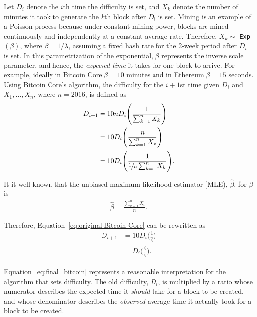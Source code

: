 Let $D_i$ denote the $i$th time the difficulty is set, and $X_k$ denote the number of minutes it took to generate the $k$th block after $D_i$ is set. 
Mining is an example of a Poisson process because under constant
mining power, blocks are mined continuously and independently at a
constant average rate.  Therefore, $X_k \sim$ \texttt{Exp}$(\beta)$, where $\beta = 1/\lambda$, assuming a fixed hash rate for the 2-week period after $D_i$ is set. In this parametrization of the exponential, $\beta$ represents the inverse scale parameter, and hence, the {\em expected time} it takes for one block to arrive. For example, ideally in Bitcoin Core $\beta=10$ minutes and in Ethereum $\beta=15$ seconds. Using Bitcoin Core's algorithm, the difficulty for the $i+1$st time given $D_i$ and $X_1, \dots, X_n$, where $n=2016$, is defined as
\begin{align}
D_{i+1} &= 10nD_i \Bigg(\frac{1}{\sum_{k=1}^{n} X_k}\Bigg) \\
&= 10D_i \Bigg(\frac{n}{\sum_{k=1}^{n} X_k}\Bigg) \\
&= 10D_i \Bigg(\frac{1}{\sfrac{1}{n}\sum_{k=1}^{n} X_k}\Bigg). \label{eq:original-Bitcoin Core}
\end{align}

 It it well known that the unbiased maximum likelihood estimator (MLE), $\hat{\beta}$, for $\beta$ is
\begin{align}
\hat{\beta} = \frac{\sum_{k=1}^{n} X_i}{n}. \label{eq:beta-hat}
\end{align}

\noindent Therefore, Equation~\ref{eq:original-Bitcoin Core} can be rewritten as:
\begin{align}
D_{i+1} &= 10D_i \bigg(\frac{1}{\hat{\beta}}\bigg) \\
&= D_i \bigg(\frac{\beta}{\hat{\beta}}\bigg). \label{eq:final_bitcoin}
\end{align}

Equation~\ref{eq:final_bitcoin} represents a reasonable interpretation for the algorithm that sets difficulty. The old difficulty, $D_i$, is multiplied by a ratio whose numerator describes the expected time it \textit{should} take for a block to be created, and whose denominator describes the \textit{observed} average time it actually took for a block to be created.

